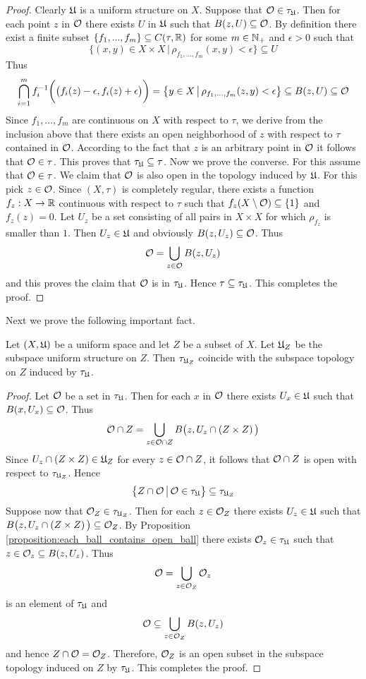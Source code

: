 \begin{proof}
Clearly ${\mathfrak U}$ is a uniform structure on $X$. Suppose that ${\mathcal O} \in \tau_{{\mathfrak U}}$. Then for each point $z$ in ${\mathcal O}$ there exists $U$ in ${\mathfrak U}$ such that $B(z,U)\subseteq {\mathcal O}$. By definition there exist a finite subset $\{f_1,...,f_m\}\subseteq C(\tau,{\mathbb R})$ for some $m \in {\mathbb N}_+$ and $\epsilon > 0$ such that
$$\big\{(x,y)\in X\times X\,\big|\,\rho_{f_1,...,f_m}(x,y) < \epsilon\big\}\subseteq U$$
Thus
$$\bigcap_{i=1}^mf_i^{-1}\bigg(\big(f_i(z) - \epsilon, f_i(z) + \epsilon\big)\bigg) = \big\{y\in X \,\big|\, \rho_{f_1,...,f_m}(z,y) < \epsilon\big\} \subseteq B(z,U)\subseteq {\mathcal O}$$
Since $f_1,...,f_m$ are continuous on $X$ with respect to $\tau$, we derive from the inclusion above that there exists an open neighborhood of $z$ with respect to $\tau$ contained in ${\mathcal O}$. According to the fact that $z$ is an arbitrary point in ${\mathcal O}$ it follows that ${\mathcal O} \in \tau$. This proves that $\tau_{{\mathfrak U}}\subseteq \tau$. Now we prove the converse. For this assume that ${\mathcal O} \in \tau$. We claim that ${\mathcal O}$ is also open in the topology induced by ${\mathfrak U}$. For this pick $z \in {\mathcal O}$. Since $(X,\tau)$ is completely regular, there exists a function $f_z:X\rightarrow {\mathbb R}$ continuous with respect to $\tau$ such that $f_z(X\setminus {\mathcal O})\subseteq \{1\}$ and $f_z(z) = 0$. Let $U_z$ be a set consisting of all pairs in $X\times X$ for which $\rho_{f_z}$ is smaller than $1$. Then $U_z\in {\mathfrak U}$ and obviously $B(z,U_z)\subseteq {\mathcal O}$. Thus
$${\mathcal O} = \bigcup_{z\in {\mathcal O}}B(z,U_z)$$
and this proves the claim that ${\mathcal O}$ is in $\tau_{{\mathfrak U}}$. Hence $\tau \subseteq \tau_{{\mathfrak U}}$. This completes the proof.
\end{proof}
\noindent
Next we prove the following important fact.

\begin{proposition}\label{proposition:the_induced_topology_preserves_uniform_subspaces}
Let $(X,{\mathfrak U})$ be a uniform space and let $Z$ be a subset of $X$. Let ${\mathfrak U}_Z$ be the subspace uniform structure on $Z$. Then $\tau_{{\mathfrak U}_Z}$ coincide with the subspace topology on $Z$ induced by $\tau_{{\mathfrak U}}$.
\end{proposition}
\begin{proof}
Let ${\mathcal O}$ be a set in $\tau_{{\mathfrak U}}$. Then for each $x$ in ${\mathcal O}$ there exists $U_x\in {\mathfrak U}$ such that $B(x,U_x)\subseteq {\mathcal O}$. Thus
$${\mathcal O} \cap Z = \bigcup_{z\in {\mathcal O}\cap Z}B\big(z,U_z\cap \left(Z\times Z\right)\big)$$
Since $U_z\cap \left(Z\times Z\right) \in {\mathfrak U}_Z$ for every $z \in {\mathcal O}\cap Z$, it follows that ${\mathcal O}\cap Z$ is open with respect to $\tau_{{\mathfrak U}_Z}$. Hence
$$\big\{Z\cap {\mathcal O}\,\big|\,{\mathcal O} \in \tau_{{\mathfrak U}}\big\} \subseteq \tau_{{\mathfrak U}_Z}$$
Suppose now that ${\mathcal O}_Z \in \tau_{{\mathfrak U}_Z}$. Then for each $z\in {\mathcal O}_Z$ there exists $U_z \in {\mathfrak U}$ such that $B\big(z,U_z\cap \left(Z\times Z\right)\big)\subseteq {\mathcal O}_Z$. By Proposition \ref{proposition:each_ball_contains_open_ball} there exists ${\mathcal O}_z \in \tau_{{\mathfrak U}}$ such that $z \in {\mathcal O}_z\subseteq B(z,U_z)$. Thus 
$${\mathcal O} = \bigcup_{z \in {\mathcal O}_Z}{\mathcal O}_z$$
is an element of $\tau_{{\mathfrak U}}$ and
$${\mathcal O} \subseteq \bigcup_{z\in {\mathcal O}_Z}B(z,U_z)$$
and hence $Z\cap {\mathcal O} = {\mathcal O}_Z$. Therefore, ${\mathcal O}_Z$ is an open subset in the subspace topology induced on $Z$ by $\tau_{{\mathfrak U}}$. This completes the proof.
\end{proof}

